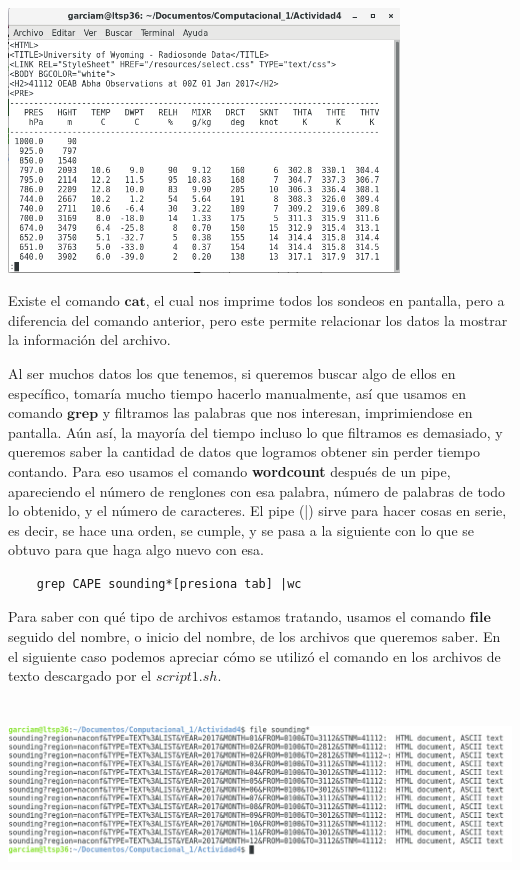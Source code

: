 \documentclass{article}
\begin{document}
    \begin{center}
    \includegraphics[height=7cm]{lessSound.png}
    \end{center}

Existe el comando $\textbf{cat}$, el cual nos imprime todos los sondeos en pantalla, pero a diferencia del comando anterior, pero este permite relacionar los datos la mostrar la información del archivo.

Al ser muchos datos los que tenemos, si queremos buscar algo de ellos en específico, tomaría mucho tiempo hacerlo manualmente, así que usamos en comando $\textbf{grep}$ y filtramos las palabras que nos interesan, imprimiendose en pantalla. Aún así, la mayoría del tiempo incluso lo que filtramos es demasiado, y queremos saber la cantidad de datos que logramos obtener sin perder tiempo contando. Para eso usamos el comando \textbf{wordcount} después de un pipe, apareciendo el número de renglones con esa palabra, número de palabras de todo lo obtenido, y el número de caracteres. El pipe (|) sirve para hacer cosas en serie, es decir, se hace una orden, se cumple, y se pasa a la siguiente con lo que se obtuvo para que haga algo nuevo con esa.

	\begin{verbatim}
	grep CAPE sounding*[presiona tab] |wc
    \end{verbatim}
    
Para saber con qué tipo de archivos estamos tratando, usamos el comando $\textbf{file}$ seguido del nombre, o inicio del nombre, de los archivos que queremos saber. En el siguiente caso podemos apreciar cómo se utilizó el comando en los archivos de texto descargado por el $script1.sh$.

    \begin{center}
    \includegraphics[height=5cm]{ascii.png}
    \end{center}
\end{document}

